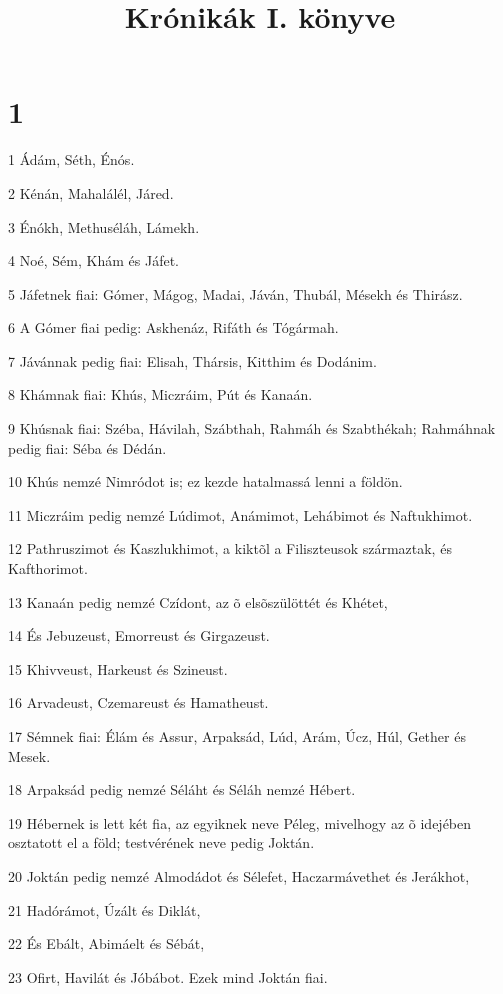 

\title{Krónikák I. könyve}


\chapter{1}

\par 1 Ádám, Séth, Énós.
\par 2 Kénán, Mahalálél, Járed.
\par 3 Énókh, Methuséláh, Lámekh.
\par 4 Noé, Sém, Khám és Jáfet.
\par 5 Jáfetnek fiai: Gómer, Mágog, Madai, Jáván, Thubál, Mésekh és Thirász.
\par 6 A Gómer fiai pedig: Askhenáz, Rifáth és Tógármah.
\par 7 Jávánnak pedig fiai: Elisah, Thársis, Kitthim és Dodánim.
\par 8 Khámnak fiai: Khús, Miczráim, Pút és Kanaán.
\par 9 Khúsnak fiai: Széba, Hávilah, Szábthah, Rahmáh és Szabthékah; Rahmáhnak pedig fiai: Séba és Dédán.
\par 10 Khús nemzé Nimródot is; ez kezde hatalmassá lenni a földön.
\par 11 Miczráim pedig nemzé Lúdimot, Anámimot, Lehábimot és Naftukhimot.
\par 12 Pathruszimot és Kaszlukhimot, a kiktõl a Filiszteusok származtak, és Kafthorimot.
\par 13 Kanaán pedig nemzé Czídont, az õ elsõszülöttét és Khétet,
\par 14 És Jebuzeust, Emorreust és Girgazeust.
\par 15 Khivveust, Harkeust és Szineust.
\par 16 Arvadeust, Czemareust és Hamatheust.
\par 17 Sémnek fiai: Élám és Assur, Arpaksád, Lúd, Arám, Úcz, Húl, Gether és Mesek.
\par 18 Arpaksád pedig nemzé Séláht és Séláh nemzé Hébert.
\par 19 Hébernek is lett két fia, az egyiknek neve Péleg, mivelhogy az õ idejében osztatott el a föld; testvérének neve pedig Joktán.
\par 20 Joktán pedig nemzé Almodádot és Sélefet, Haczarmávethet és Jerákhot,
\par 21 Hadórámot, Úzált és Diklát,
\par 22 És Ebált, Abimáelt és Sébát,
\par 23 Ofirt, Havilát és Jóbábot. Ezek mind Joktán fiai.
